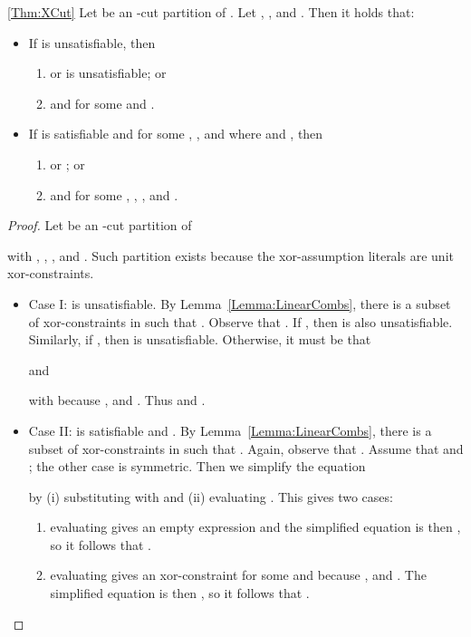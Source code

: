 \begin{retheorem}{\ref{Thm:XCut}}
Let  be an -cut partition of .
Let , , and .
 Then
it holds that:
\begin{itemize}
\item If  is unsatisfiable, then
\begin{enumerate}
\item  
or  is unsatisfiable; or 
\item  and  for some 
and .
\end{enumerate}
\item 
If  is satisfiable
and  for some , , and  where  and , then
\begin{enumerate}
\item 
or ;
or
\item  and  for some ,
, , and .
\end{enumerate}
\end{itemize}
\end{retheorem}
\begin{proof}
  Let  be an -cut partition of
  
  with
  ,
  ,
  , and
  .
Such partition exists because the xor-assumption literals 
  are unit xor-constraints.

  \begin{itemize}
\item  Case I:  is unsatisfiable.
By Lemma~\ref{Lemma:LinearCombs},
  there is a subset  of xor-constraints
  in 
  such that .
Observe that
  .
If ,
  then
   is also unsatisfiable.
Similarly,
  if ,
  then  is unsatisfiable.
Otherwise,
  it must be that
  
  and
  
  with 
  because
  ,
   and
  .
Thus
   and
  .
  
 \item Case II:
   is satisfiable
  and
  .
By Lemma~\ref{Lemma:LinearCombs},
 there is a subset  of xor-constraints
  in 
  such that .
Again,
  observe that
  .
Assume that  and ; the other case is symmetric.
Then we simplify the equation
 
by (i) substituting  with  and (ii) evaluating .
This gives two cases:
\begin{enumerate}
\item evaluating  gives
an empty expression and the simplified equation is then , so it follows that
  .

\item evaluating  gives
an xor-constraint  for some  and  because 
  ,
   and
  .
The simplified equation is then ,
so it follows that
  .
\end{enumerate}
\end{itemize}
\end{proof}

